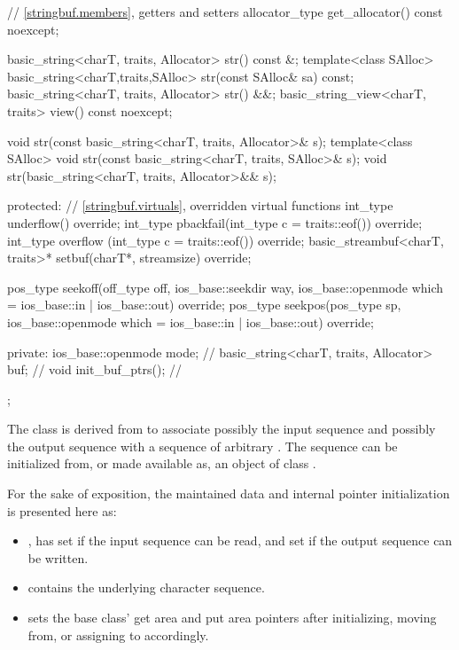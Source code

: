\begin{codeblock}
{{    // \ref{stringbuf.members}, getters and setters
    allocator_type get_allocator() const noexcept;

    basic_string<charT, traits, Allocator> str() const &;
    template<class SAlloc>
      basic_string<charT,traits,SAlloc> str(const SAlloc& sa) const;
    basic_string<charT, traits, Allocator> str() &&;
    basic_string_view<charT, traits> view() const noexcept;

    void str(const basic_string<charT, traits, Allocator>& s);
    template<class SAlloc>
      void str(const basic_string<charT, traits, SAlloc>& s);
    void str(basic_string<charT, traits, Allocator>&& s);

  protected:
    // \ref{stringbuf.virtuals}, overridden virtual functions
    int_type underflow() override;
    int_type pbackfail(int_type c = traits::eof()) override;
    int_type overflow (int_type c = traits::eof()) override;
    basic_streambuf<charT, traits>* setbuf(charT*, streamsize) override;

    pos_type seekoff(off_type off, ios_base::seekdir way,
                     ios_base::openmode which
                      = ios_base::in | ios_base::out) override;
    pos_type seekpos(pos_type sp,
                     ios_base::openmode which
                      = ios_base::in | ios_base::out) override;

  private:
    ios_base::openmode mode;                        // \expos
    basic_string<charT, traits, Allocator> buf;     // \expos
    void init_buf_ptrs();                           // \expos
  };
}
\end{codeblock}

\pnum
The class
is derived from
to associate possibly the input sequence and possibly
the output sequence with a sequence of arbitrary
.
The sequence can be initialized from, or made available as, an object of class
.

\pnum
For the sake of exposition,
the maintained data and internal pointer initialization is presented here as:
\begin{itemize}
\item
  , has
   set if the input sequence can be read, and
   set if the output sequence can be written.
\item
  contains the underlying character sequence.
\item
   sets the base class'
  get area and
  put area pointers
  after initializing, moving from, or assigning to  accordingly.
\end{itemize}

